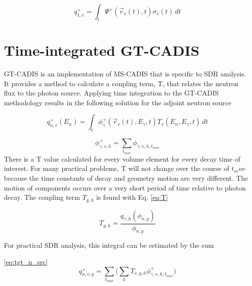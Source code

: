  \begin{equation}\label{eq:adj_src_1_avg}
	 q_{1,v}^{+} =
	 \int_{t}  \Psi^{+}(\overrightarrow{r}_{v}(t), t)
	 \sigma_{v}(t)\, dt
 \end{equation}
 
\section{Time-integrated GT-CADIS}
GT-CADIS is an implementation of MS-CADIS that is specific to SDR analysis.  It
provides a method to calculate a coupling term, T, that relates the neutron
flux to the photon source.
Applying time integration to the GT-CADIS methodology results in the following
solution for the adjoint neutron source

 \begin{equation}\label{eq:adj_src_1_avg}
	 q_{n,v}^{+}(E_{n}) =
	 \int_{t}     \phi_{\gamma}^{+}(\overrightarrow{r}_{v}(t), E_{\gamma},t)
	 T_{v}(E_n, E_{\gamma}, t)\, dt
 \end{equation}

\begin{equation}\label{eq:sum}
	\phi_{\gamma,v, h}^{+} = \sum_{t_{mov}}{\phi_{\gamma,v,h,t_{mov}}}
\end{equation}
 There is a T value calculated for every volume element for every decay time of
 interest.  For many practical problems, T will not change over the course of
 $t_mov$  because the time constants of decay and geometry
 motion are very different.  The motion of components occurs over a very short
 period of time relative to photon decay.  
The coupling term $T_{g,h}$ is found with Eq.
\ref{eq:T}

\begin{equation}\label{eq:T}
	T_{g,h} = \dfrac{q_{\gamma, h}(\phi_{n,g})}{\phi_{n,g}}
\end{equation}

For practical SDR analysis, this integral can be estimated by the sum
 
\ref{eq:tgt_n_src}
\begin{equation}\label{eq:tgt_n_src}
	q_{n,v,g}^{+} =
	\sum_{t_{mov}}\Bigg(\sum_{h} T_{v,g,h} \phi_{\gamma,v,h,t_{mov}}^{+}\Bigg)
\end{equation}
